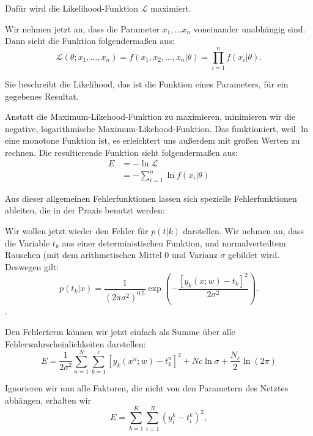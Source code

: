 Dafür wird die Likelihood-Funktion $\mathcal{L}$ maximiert.

Wir nehmen jetzt an, dass die Parameter $x_1, \ldots x_n$ voneinander unabhängig sind. Dann sieht die Funktion folgendermaßen aus:
\begin{equation}
  \mathcal{L} (\theta; x_1, \ldots, x_n) =
  f(x_1, x_2, \ldots, x_n | \theta) =
  \prod_{i = 1}^n f(x_i|\theta) .
\end{equation}

Sie beschreibt die Likelihood, das ist die Funktion eines Parameters, für ein gegebenes Resultat. %

Anstatt die Maximum-Likehood-Funktion zu maximieren, minimieren wir die negative, logarithmische Maximum-Likehood-Funktion. Das funktioniert, weil $\ln$ eine monotone Funktion ist, es erleichtert uns außerdem mit großen Werten zu rechnen. Die resultierende Funktion sieht folgendermaßen aus:
\begin{align}
 E  & = - \ln \mathcal{L} \\
  & = - \sum_{i=1}^n \ln f(x_i|\theta) 
\end{align}

Aus dieser allgemeinen Fehlerfunktionen lassen sich spezielle Fehlerfunktionen ableiten, die in der Praxis benutzt werden\cite{bishop1995neural}:

Wir wollen jetzt wieder den Fehler für $p(t|k)$ darstellen. Wir nehmen an, dass die Variable $t_k$ aus einer deterministischen Funktion, und normalverteiltem Rauschen (mit dem arithmetischen Mittel $0$ und Varianz $\sigma$ gebildet wird.  
Deswegen gilt: %
\begin{equation}
  p(t_k|x) = \frac{1}{(2 \pi \sigma^2)^{0.5}} \exp \left( -\frac{ \left[  y_k(x; w) - t_k \right]^2 }{2 \sigma^2} \right).
\end{equation}.

Den Fehlerterm können wir jetzt einfach als Summe über alle Fehlerwahrscheinlichkeiten darstellen:
\begin{equation}
  E = \frac{1}{2 \sigma^2} \sum_{n=1}^{N} \sum_{k=1}^{c} \left[ y_k(x^n; w) - t_k^n \right]^2 + Nc \ln \sigma + \frac{N_c}{2} \ln (2 \pi)
\end{equation}

Ignorieren wir nun alle Faktoren, die nicht von den Parametern des Netztes abhängen, erhalten wir 
\begin{equation}
\label{eq:MSE}
E = \sum_{k=1}^K \sum_{i=1}^N \left( y_i^k - t_i^k \right)^2,
\end{equation}

